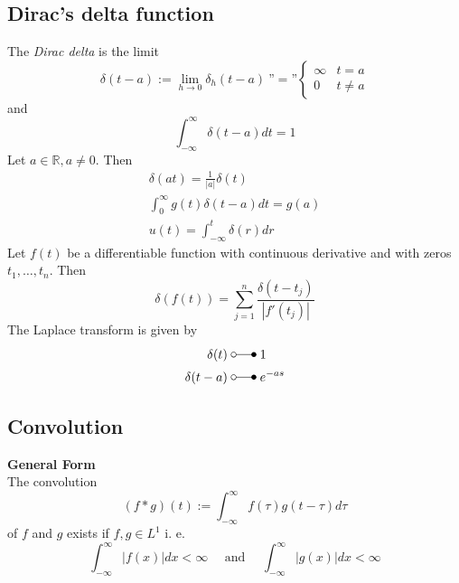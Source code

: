 \subsection{Dirac's delta function}
The \textit{Dirac delta} is the limit
\begin{equation*}
    \delta(t-a):=\lim_{h\to0}\delta_h(t-a)\:\text{''}=\text{''}
    \begin{cases}
        \infty & t=a    \\
        0      & t\ne a
    \end{cases}
\end{equation*}
and
\begin{equation*}
    \int_{-\infty}^{\infty}\delta(t-a)dt=1
\end{equation*}
Let $a \in \mathbb{R}, a \ne 0$. Then
\begin{gather*}
    \delta(at)=\frac1{|a|}\delta(t) \\
    \int_{0}^{\infty} g(t)\delta(t-a)dt=g(a) \\
    u(t)=\int_{-\infty}^{t}\delta(r)dr
\end{gather*}
Let $f(t)$ be a differentiable function with continuous derivative and with zeros $t_1,\dots,t_n$. Then
\begin{equation*}
    \delta(f(t))=\sum_{j=1}^n\frac{\delta(t-t_j)}{|f'(t_j)|}
\end{equation*}
The Laplace transform is given by
\begin{align*}
    \delta(t)   & \;\laplace\; 1       \\
    \delta(t-a) & \;\laplace\; e^{-as}
\end{align*}

\subsection{Convolution}
\textbf{General Form}\\
The convolution
\begin{equation*}
    (f*g)(t):=\int_{-\infty}^{\infty}f(\tau)g(t-\tau)d\tau
\end{equation*}
of $f$ and $g$ exists if $f,g\in L^1$ i. e.
\begin{equation*}
    \int_{-\infty}^{\infty}\left|f(x)\right|dx<\infty\quad\text{ and }\quad\int_{-\infty}^{\infty}\left|g(x)\right|dx<\infty
\end{equation*}

